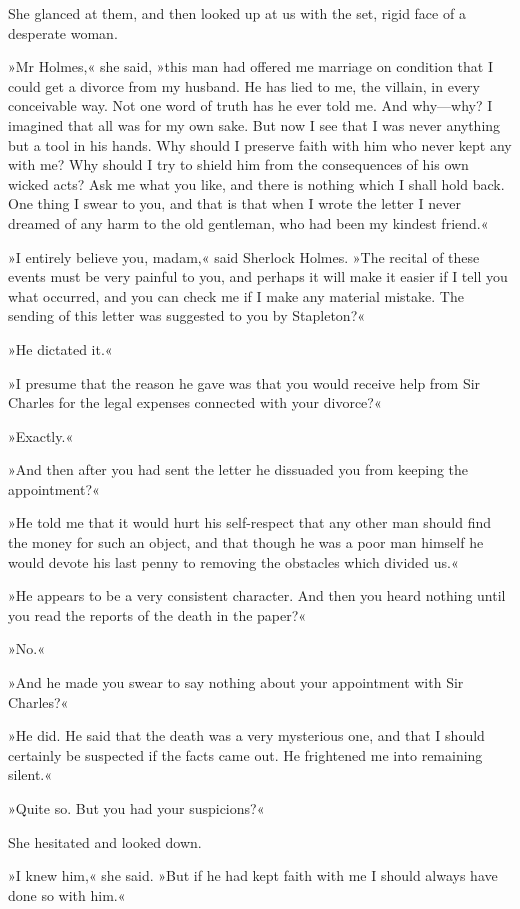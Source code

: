 She glanced at them, and then looked up at us with the set, rigid face of a desperate woman.

»Mr Holmes,« she said, »this man had offered me marriage on condition that I could get a divorce from my husband. He has lied to me, the villain, in every conceivable way. Not one word of truth has he ever told me. And why—why? I imagined that all was for my own sake. But now I see that I was never anything but a tool in his hands. Why should I preserve faith with him who never kept any with me? Why should I try to shield him from the consequences of his own wicked acts? Ask me what you like, and there is nothing which I shall hold back. One thing I swear to you, and that is that when I wrote the letter I never dreamed of any harm to the old gentleman, who had been my kindest friend.«

»I entirely believe you, madam,« said Sherlock Holmes. »The recital of these events must be very painful to you, and perhaps it will make it easier if I tell you what occurred, and you can check me if I make any material mistake. The sending of this letter was suggested to you by Stapleton?«

»He dictated it.«

»I presume that the reason he gave was that you would receive help from Sir Charles for the legal expenses connected with your divorce?«

»Exactly.«

»And then after you had sent the letter he dissuaded you from keeping the appointment?«

»He told me that it would hurt his self-respect that any other man should find the money for such an object, and that though he was a poor man himself he would devote his last penny to removing the obstacles which divided us.«

»He appears to be a very consistent character. And then you heard nothing until you read the reports of the death in the paper?«

»No.«

»And he made you swear to say nothing about your appointment with Sir Charles?«

»He did. He said that the death was a very mysterious one, and that I should certainly be suspected if the facts came out. He frightened me into remaining silent.«

»Quite so. But you had your suspicions?«

She hesitated and looked down.

»I knew him,« she said. »But if he had kept faith with me I should always have done so with him.«

